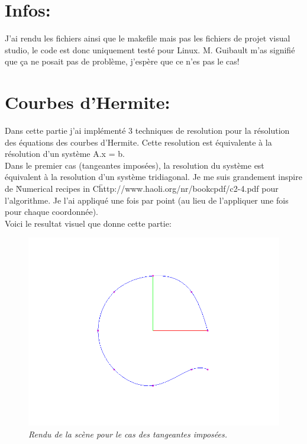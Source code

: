\documentclass[12pt,letterpaper]{article}
\begin{document}
    
     
	\newpage
	
    \section{Infos:}
	J'ai rendu les fichiers ainsi que le makefile mais pas les fichiers de projet visual studio, le code est donc uniquement testé pour Linux. M. Guibault m'as signifié que ça ne posait pas de problème, j'espère que ce n'es pas le cas!

    \section{Courbes d'Hermite:}
	\setlength{\parindent}{1cm}

	Dans cette partie j'ai implémenté 3 techniques de resolution pour la résolution des équations des courbes d'Hermite. Cette resolution est équivalente à la résolution d'un système A.x = b.\\
	Dans le premier cas (tangeantes imposées), la resolution du système est équivalent à la resolution d'un système tridiagonal. Je me suis grandement inspire de \"Numerical recipes in C\" http://www.haoli.org/nr/bookcpdf/c2-4.pdf pour l'algorithme. Je l'ai appliqué une fois par point (au lieu de l'appliquer une fois pour chaque coordonnée).\\
	Voici le resultat visuel que donne cette partie:
\begin{figure}[h!]
	\centering
	\includegraphics[scale=0.3]{images/imposedtang.png}
	\caption{\textit{Rendu de la scène pour le cas des tangeantes imposées.}}
\end{figure}
	
\end{document}
